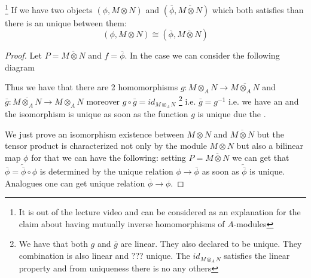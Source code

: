 \begin{lemma}
  \footnote{
    It is out of the lecture video and can be considered as an
    explanation for the claim about having mutually inverse
    homomorphisms of $A$-modules
  }
  If we have two objects $\left(\phi, M \otimes N\right)$
  and $\left(\overline{\phi},\overline{M \otimes N}\right)$
  which both satisfies  than there is
  an unique  between them: 
  \[
  \left(\phi, M \otimes N\right) \cong \left(\overline{\phi},
  \overline{M \otimes N}\right)
  \]
\begin{proof}
Let $P = \overline{M \otimes N}$ and $f =
\overline{\phi}$. In 
the case we can consider the following diagram


Thus we have that there are 2 homomorphisms
$g :  M \otimes_A N \to \overline{ M \otimes_A N}$
and
$\bar{g} :  \overline{M \otimes_A N} \to M \otimes_A N$ moreover
$g \circ \bar{g} = id_{M \otimes_A N}$
\footnote{
  We have that both $g$ and $\bar{g}$ are linear. They also declared
  to be unique. They combination is also linear and ??? unique. The
  $id_{M \otimes_A N}$ satisfies the linear property and from
  uniqueness there is no any others
}
i.e. $\bar{g} = g^{-1}$ i.e. we have an
 and the isomorphism is unique as soon as the
function $g$ is unique due the .

We just prove an isomorphism existence between
$M \otimes N$ and $\overline{M \otimes N}$ but the tensor product is
characterized not only by the module $M \otimes N$
but also a bilinear map $\phi$ for that we can have the following:
setting $P = \overline{M \otimes N}$ we
can get that $\bar{\phi} = \tilde{\bar{\phi}} \circ \phi$ is
determined by the unique
relation $\phi \to \bar{\phi}$ as soon as
$\tilde{\bar{\phi}}$ is unique. Analogues one can get unique relation
$\bar{\phi} \to \phi$.
\end{proof}
\label{lem:universalpropertyuniqueness}
\end{lemma}

